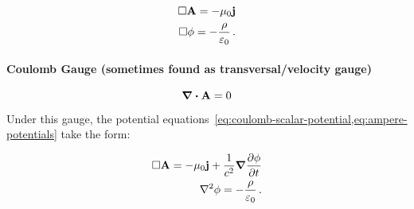 \documentclass[12pt, class=report, crop=false]{standalone}
\begin{document}
\begin{subequations}
  \begin{align}
    \Box \vb{A} = -\mu_0 \vb{j}\\
    \Box \phi = -\frac{\rho}{\varepsilon_0}  \,.
  \end{align}
\end{subequations}

\paragraph{Coulomb Gauge (sometimes found as transversal/velocity gauge)}

\begin{equation}
  \div{\vb{A}} = 0
\end{equation}

\par
Under this gauge, the potential equations~\cref{eq:coulomb-scalar-potential,eq:ampere-potentials} take the form:

\begin{subequations}
  \begin{align}
    \Box \vb{A} = -\mu_0 \vb{j} + \frac{1}{c^{2}} \grad{\pdv{\phi}{t}}\\
    \laplacian{\phi} = -\frac{\rho}{\varepsilon_0}  \,.
  \end{align}
\end{subequations}
\end{document}
